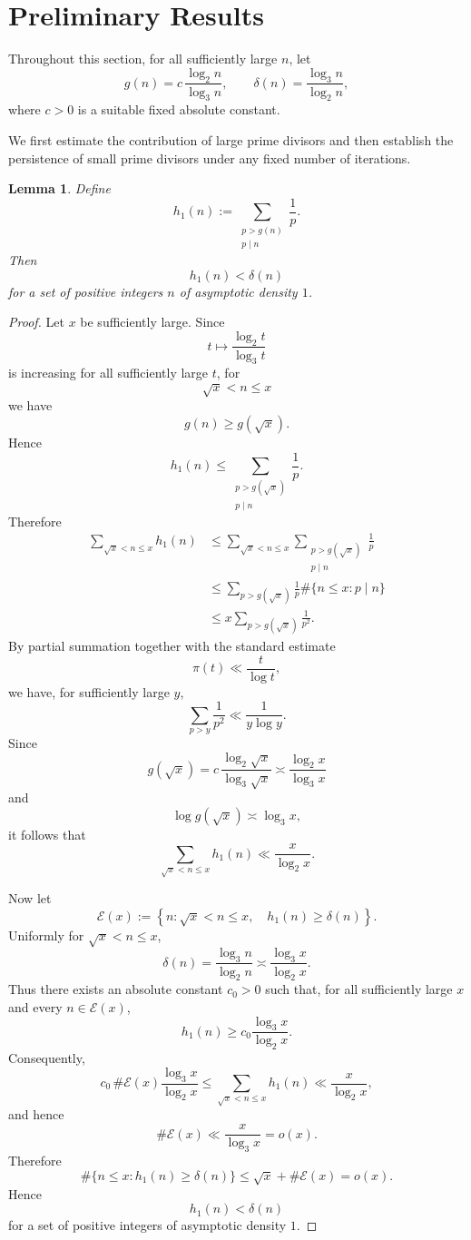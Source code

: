 \documentclass{article}
\newtheorem{lemma}{Lemma}
\begin{document}
\section{Preliminary Results}
\label{sec:preliminaries}

Throughout this section, for all sufficiently large $n$, let
\[
g(n)
=
c\,\frac{\log_2 n}{\log_3 n},
\qquad
\delta(n)
=
\frac{\log_3 n}{\log_2 n},
\]
where $c>0$ is a suitable fixed absolute constant.

We first estimate the contribution of large prime divisors and then
establish the persistence of small prime divisors under any fixed
number of iterations.

\begin{lemma}\label{lem:old-large-primes}
Define
\[
h_1(n)
:=
\sum_{\substack{p>g(n)\\p\mid n}}\frac1p.
\]
Then
\[
h_1(n)<\delta(n)
\]
for a set of positive integers $n$ of asymptotic density $1$.
\end{lemma}

\begin{proof}
Let $x$ be sufficiently large. Since
\[
t\longmapsto\frac{\log_2t}{\log_3t}
\]
is increasing for all sufficiently large $t$, for
\[
\sqrt{x}<n\le x
\]
we have
\[
g(n)\ge g(\sqrt{x}).
\]
Hence
\[
h_1(n)
\le
\sum_{\substack{p>g(\sqrt{x})\\p\mid n}}\frac1p.
\]
Therefore
\[
\begin{aligned}
\sum_{\sqrt{x}<n\le x}h_1(n)
&\le
\sum_{\sqrt{x}<n\le x}
\sum_{\substack{p>g(\sqrt{x})\\p\mid n}}\frac1p\\
&\le
\sum_{p>g(\sqrt{x})}\frac1p
\#\{n\le x:p\mid n\}\\
&\le
x\sum_{p>g(\sqrt{x})}\frac1{p^2}.
\end{aligned}
\]
By partial summation together with the standard estimate
\[
\pi(t)\ll\frac{t}{\log t},
\]
we have, for sufficiently large $y$,
\[
\sum_{p>y}\frac1{p^2}
\ll
\frac1{y\log y}.
\]
Since
\[
g(\sqrt{x})
=
c\,\frac{\log_2\sqrt{x}}{\log_3\sqrt{x}}
\asymp
\frac{\log_2x}{\log_3x}
\]
and
\[
\log g(\sqrt{x})\asymp\log_3x,
\]
it follows that
\[
\sum_{\sqrt{x}<n\le x}h_1(n)
\ll
\frac{x}{\log_2x}.
\]

Now let
\[
\mathcal E(x)
:=
\left\{
n:\sqrt{x}<n\le x,\quad
h_1(n)\ge\delta(n)
\right\}.
\]
Uniformly for $\sqrt{x}<n\le x$,
\[
\delta(n)
=
\frac{\log_3n}{\log_2n}
\asymp
\frac{\log_3x}{\log_2x}.
\]
Thus there exists an absolute constant $c_0>0$ such that, for all
sufficiently large $x$ and every $n\in\mathcal E(x)$,
\[
h_1(n)
\ge
c_0\frac{\log_3x}{\log_2x}.
\]
Consequently,
\[
c_0\,\#\mathcal E(x)
\frac{\log_3x}{\log_2x}
\le
\sum_{\sqrt{x}<n\le x}h_1(n)
\ll
\frac{x}{\log_2x},
\]
and hence
\[
\#\mathcal E(x)
\ll
\frac{x}{\log_3x}
=o(x).
\]
Therefore
\[
\#\{n\le x:h_1(n)\ge\delta(n)\}
\le
\sqrt{x}+\#\mathcal E(x)
=o(x).
\]
Hence
\[
h_1(n)<\delta(n)
\]
for a set of positive integers of asymptotic density $1$.
\end{proof}
\end{document}
